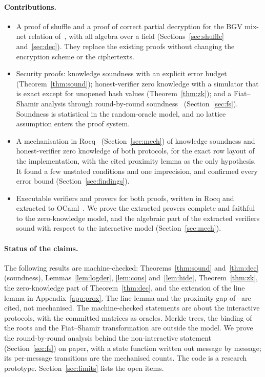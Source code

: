 \documentclass[sigconf,anonymous]{acmart}
\begin{document}
\paragraph{Contributions.}
\begin{itemize}[leftmargin=1.2em,itemsep=2pt,topsep=3pt]
\item A proof of shuffle and a proof of correct partial decryption for the BGV mix-net relation
  of~\cite{ABGS23}, with all algebra over a field (Sections~\ref{sec:shuffle} and~\ref{sec:dec}).
  They replace the existing proofs without changing the encryption scheme or the ciphertexts.
\item Security proofs: knowledge soundness with an explicit error budget (Theorem~\ref{thm:sound});
  honest-verifier zero knowledge with a simulator that is exact except for unopened hash values
  (Theorem~\ref{thm:zk}); and a Fiat--Shamir analysis through round-by-round
  soundness~\cite{BCS16,Hol19,CMS19} (Section~\ref{sec:fs}). Soundness is statistical in the
  random-oracle model, and no lattice assumption enters the proof system.
\item A mechanisation in Rocq~\cite{Rocq} (Section~\ref{sec:mech}) of knowledge soundness and
  honest-verifier zero knowledge of both protocols, for the exact row layout of the
  implementation, with the cited proximity lemma as the only hypothesis. It found a few unstated
  conditions and one imprecision, and confirmed every error bound (Section~\ref{sec:findings}).
\item Executable verifiers and provers for both proofs, written in Rocq and extracted to
  OCaml~\cite{Letouzey02}. We prove the extracted provers complete and faithful to the
  zero-knowledge model, and the algebraic part of the extracted verifiers sound with respect to
  the interactive model (Section~\ref{sec:mech}).
\end{itemize}

\paragraph{Status of the claims.}
The following results are machine-checked: Theorems~\ref{thm:sound} and~\ref{thm:dec} (soundness),
Lemmas~\ref{lem:logder}, \ref{lem:cons} and~\ref{lem:hide}, Theorem~\ref{thm:zk}, the
zero-knowledge part of Theorem~\ref{thm:dec}, and the extension of the line lemma in
Appendix~\ref{app:prox}. The line lemma and the proximity gap of~\cite{BCIKS20} are cited, not
mechanised. The machine-checked statements are about the interactive protocols, with the committed
matrices as oracles. Merkle trees, the binding of the roots and the Fiat--Shamir transformation are
outside the model. We prove the round-by-round analysis behind the non-interactive statement
(Section~\ref{sec:fs}) on paper, with a state function written out message by message; its
per-message transitions are the mechanised counts. The code is a research prototype.
Section~\ref{sec:limits} lists the open items.
\end{document}
